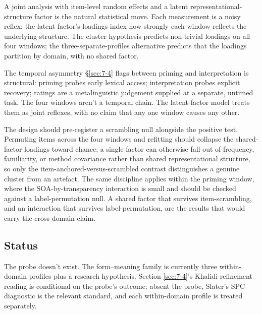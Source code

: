 A joint analysis with item-level random effects and a latent representational-structure factor is the natural statistical move. Each measurement is a noisy reflex; the latent factor's loadings index how strongly each window reflects the underlying structure. The cluster hypothesis predicts non-trivial loadings on all four windows; the three-separate-profiles alternative predicts that the loadings partition by domain, with no shared factor.

The temporal asymmetry §\ref{sec:7-4} flags between priming and interpretation is structural: priming probes early lexical access; interpretation probes explicit recovery; ratings are a metalinguistic judgement supplied at a separate, untimed task. The four windows aren't a temporal chain. The latent-factor model treats them as joint reflexes, with no claim that any one window causes any other.

The design should pre-register a scrambling null alongside the positive test. Permuting items across the four windows and refitting should collapse the shared-factor loadings toward chance; a single factor can otherwise fall out of frequency, familiarity, or method covariance rather than shared representational structure, so only the item-anchored-versus-scrambled contrast distinguishes a genuine cluster from an artefact. The same discipline applies within the priming window, where the SOA-by-transparency interaction is small and should be checked against a label-permutation null. A shared factor that survives item-scrambling, and an interaction that survives label-permutation, are the results that would carry the cross-domain claim.

\subsection{Status}

The probe doesn't exist. The form--meaning family is currently three within-domain profiles plus a research hypothesis. Section \ref{sec:7-4}'s Khalidi-refinement reading is conditional on the probe's outcome; absent the probe, Slater's SPC diagnostic is the relevant standard, and each within-domain profile is treated separately.
